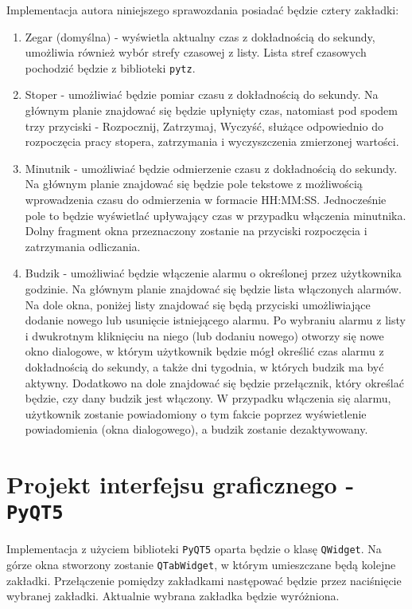\documentclass[11pt]{article}
\begin{document}
    Implementacja autora niniejszego sprawozdania posiadać będzie cztery zakładki:
    \begin{enumerate}
        \item Zegar (domyślna) - wyświetla aktualny czas z dokładnością do sekundy,
        umożliwia również wybór strefy czasowej z listy.
        Lista stref czasowych pochodzić będzie z biblioteki \texttt{pytz}.
        \item Stoper - umożliwiać będzie pomiar czasu z dokładnością do sekundy.
        Na głównym planie znajdować się będzie upłynięty czas, natomiast pod spodem
        trzy przyciski - Rozpocznij, Zatrzymaj, Wyczyść, służące odpowiednio do 
        rozpoczęcia pracy stopera, zatrzymania i wyczyszczenia zmierzonej wartości.
        \item Minutnik - umożliwiać będzie odmierzenie czasu z dokładnością do sekundy.
        Na głównym planie znajdować się będzie pole tekstowe z możliwością wprowadzenia czasu
        do odmierzenia w formacie HH:MM:SS.
        Jednocześnie pole to będzie wyświetlać upływający czas w przypadku włączenia minutnika.
        Dolny fragment okna przeznaczony zostanie na przyciski rozpoczęcia i zatrzymania odliczania.
        \item Budzik - umożliwiać będzie włączenie alarmu o określonej przez użytkownika godzinie.
        Na głównym planie znajdować się będzie lista włączonych alarmów. Na dole okna, poniżej listy znajdować
        się będą przyciski umożliwiające dodanie nowego lub usunięcie istniejącego alarmu. 
        Po wybraniu alarmu z listy i dwukrotnym kliknięciu na niego (lub dodaniu nowego) otworzy się nowe okno dialogowe, w którym
        użytkownik będzie mógł określić czas alarmu z dokładnością do sekundy, a także dni tygodnia, w których
        budzik ma być aktywny. Dodatkowo na dole znajdować się będzie przełącznik, który określać będzie,
        czy dany budzik jest włączony. W przypadku włączenia się alarmu,
        użytkownik zostanie powiadomiony o tym fakcie poprzez wyświetlenie powiadomienia (okna dialogowego), a budzik zostanie dezaktywowany.
    \end{enumerate}

    \section{Projekt interfejsu graficznego - \texttt{PyQT5}}
    Implementacja z użyciem biblioteki \texttt{PyQT5} oparta będzie o klasę \texttt{QWidget}.
    Na górze okna stworzony zostanie \texttt{QTabWidget}, w którym umieszczane będą kolejne zakładki.
    Przełączenie pomiędzy zakładkami następować będzie przez naciśnięcie wybranej zakładki. Aktualnie wybrana
    zakładka będzie wyróżniona.
\end{document}
